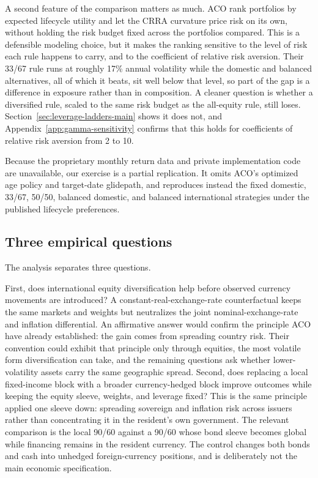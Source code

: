 \documentclass[11pt]{article}
\begin{document}
A second feature of the comparison matters as much. ACO rank portfolios by
expected lifecycle utility and let the CRRA curvature price risk on its own,
without holding the risk budget fixed across the portfolios compared. This is a
defensible modeling choice, but it makes the ranking sensitive to the level of
risk each rule happens to carry, and to the coefficient of relative risk
aversion. Their 33/67 rule runs at roughly 17\% annual volatility while the
domestic and balanced alternatives, all of which it beats, sit well below that
level, so part of the
gap is a difference in exposure rather than in composition. A cleaner question
is whether a diversified rule, scaled to the same risk budget as the all-equity
rule, still loses. Section~\ref{sec:leverage-ladders-main} shows it does not,
and Appendix~\ref{app:gamma-sensitivity} confirms that this holds for
coefficients of relative risk aversion from 2 to 10.

Because the proprietary monthly return data and private implementation code
are unavailable, our exercise is a partial replication. It omits ACO's
optimized age policy and target-date glidepath, and reproduces instead the
fixed domestic, 33/67, 50/50, balanced domestic, and balanced international
strategies under the published lifecycle preferences.

\subsection{Three empirical questions}

The analysis separates three questions.

First, does international equity diversification help before observed currency
movements are introduced? A constant-real-exchange-rate counterfactual keeps
the same markets and weights but neutralizes the joint nominal-exchange-rate
and inflation differential. An affirmative answer would confirm the principle
ACO have already established: the gain comes from spreading country risk.
Their convention could exhibit that principle only through equities, the most
volatile form diversification can take, and the remaining questions ask
whether lower-volatility assets carry the same geographic spread.
Second, does replacing a local fixed-income block with a broader
currency-hedged block
improve outcomes while keeping the equity sleeve, weights, and leverage fixed?
This is the same principle applied one sleeve down: spreading sovereign and
inflation risk across issuers rather than concentrating it in the resident's
own government. The relevant comparison
is the local 90/60 against a 90/60 whose bond sleeve becomes global while
financing remains in the resident currency.
The control changes both bonds and cash into unhedged foreign-currency
positions, and is deliberately not the main economic specification.
\end{document}
